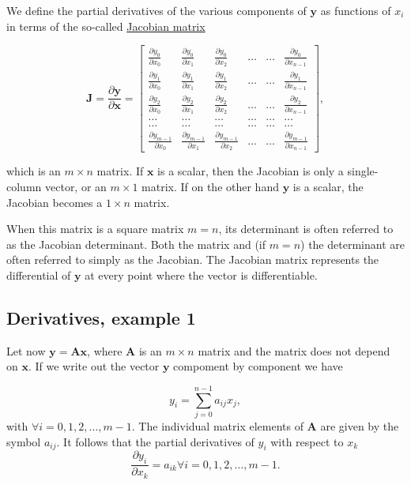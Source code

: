 \documentclass[%
oneside,                 %
final,                   %
10pt]{article}
\begin{document}
We define the partial derivatives of the various components of $\bm{y}$ as functions of $x_i$ in terms of the so-called \href{{https://en.wikipedia.org/wiki/Jacobian_matrix_and_determinant}}{Jacobian matrix}

\[
\bm{J}=\frac{\partial \bm{y}}{\partial \bm{x}}=\begin{bmatrix} \frac{\partial y_0}{\partial x_0} & \frac{\partial y_0}{\partial x_1} & \frac{\partial y_0}{\partial x_2} & \dots & \dots & \frac{\partial y_0}{\partial x_{n-1}} \\ \frac{\partial y_1}{\partial x_0} & \frac{\partial y_1}{\partial x_1} & \frac{\partial y_1}{\partial x_2} & \dots & \dots & \frac{\partial y_1}{\partial x_{n-1}} \\
\frac{\partial y_2}{\partial x_0} & \frac{\partial y_2}{\partial x_1} & \frac{\partial y_2}{\partial x_2} & \dots & \dots & \frac{\partial y_2}{\partial x_{n-1}} \\
\dots & \dots & \dots & \dots & \dots & \dots \\
\dots & \dots & \dots & \dots & \dots & \dots \\
\frac{\partial y_{m-1}}{\partial x_0} & \frac{\partial y_{m-1}}{\partial x_1} & \frac{\partial y_{m-1}}{\partial x_2} & \dots & \dots & \frac{\partial y_{m-1}}{\partial x_{n-1}} \end{bmatrix},
\]

which is an $m\times n$ matrix. If $\bm{x}$ is a scalar, then the
Jacobian is only a single-column vector, or an $m\times 1$ matrix. If
on the other hand $\bm{y}$ is a scalar, the Jacobian becomes a
$1\times n$ matrix.

When this matrix is a square matrix $m=n$, its determinant is often referred to as the Jacobian
determinant. Both the matrix and (if $m=n$) the determinant are
often referred to simply as the Jacobian. The Jacobian matrix represents the differential of $\bm{y}$ at every point where the
vector is differentiable. 

\subsection*{Derivatives, example 1}

Let now $\bm{y}=\bm{A}\bm{x}$, where $\bm{A}$ is an $m\times n$ matrix and the matrix does not depend on $\bm{x}$. If we write out the vector $\bm{y}$ compoment by component we have

\[
y_i = \sum_{j=0}^{n-1}a_{ij}x_j,
\]
with $\forall i=0,1,2,\dots,m-1$. The individual matrix elements of $\bm{A}$ are given by the symbol $a_{ij}$.
It follows that the partial derivatives of $y_i$ with respect to $x_k$ 
\[
\frac{\partial y_i }{\partial x_k}= a_{ik} \forall i=0,1,2,\dots,m-1.
\]
\end{document}
